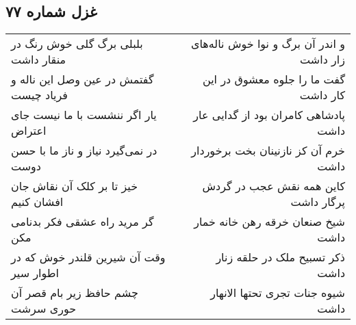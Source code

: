 \begin{center}
\section*{غزل شماره ۷۷}
\label{sec:sh077}
\begin{longtable}{l p{0.5cm} r}
بلبلی برگ گلی خوش رنگ در منقار داشت
&&
و اندر آن برگ و نوا خوش ناله‌های زار داشت
\\
گفتمش در عین وصل این ناله و فریاد چیست
&&
گفت ما را جلوه معشوق در این کار داشت
\\
یار اگر ننشست با ما نیست جای اعتراض
&&
پادشاهی کامران بود از گدایی عار داشت
\\
در نمی‌گیرد نیاز و ناز ما با حسن دوست
&&
خرم آن کز نازنینان بخت برخوردار داشت
\\
خیز تا بر کلک آن نقاش جان افشان کنیم
&&
کاین همه نقش عجب در گردش پرگار داشت
\\
گر مرید راه عشقی فکر بدنامی مکن
&&
شیخ صنعان خرقه رهن خانه خمار داشت
\\
وقت آن شیرین قلندر خوش که در اطوار سیر
&&
ذکر تسبیح ملک در حلقه زنار داشت
\\
چشم حافظ زیر بام قصر آن حوری سرشت
&&
شیوه جنات تجری تحتها الانهار داشت
\\
\end{longtable}
\end{center}
